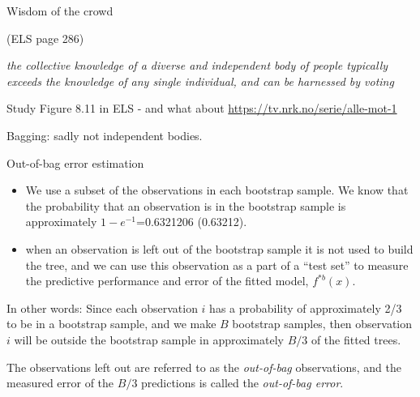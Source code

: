 \documentclass[
  ignorenonframetext,
]{beamer}
\providecommand{\tightlist}{%
  \setlength{\itemsep}{0pt}\setlength{\parskip}{0pt}}
\begin{document}
\begin{frame}

\begin{block}{Wisdom of the crowd}

(ELS page 286)

\emph{the collective knowledge of a diverse and independent body of
people typically exceeds the knowledge of any single individual, and can
be harnessed by voting}

Study Figure 8.11 in ELS - and what about
\url{https://tv.nrk.no/serie/alle-mot-1}

Bagging: sadly not independent bodies.

\end{block}

\end{frame}

\begin{frame}

\begin{block}{Out-of-bag error estimation}

\begin{itemize}
\tightlist
\item
  We use a subset of the observations in each bootstrap sample. We know
  that the probability that an observation is in the bootstrap sample is
  approximately \(1-e^{-1}\)=0.6321206 (0.63212).
\item
  when an observation is left out of the bootstrap sample it is not used
  to build the tree, and we can use this observation as a part of a
  ``test set'' to measure the predictive performance and error of the
  fitted model, \(f^{*b}(x)\).
\end{itemize}

In other words: Since each observation \(i\) has a probability of
approximately 2/3 to be in a bootstrap sample, and we make \(B\)
bootstrap samples, then observation \(i\) will be outside the bootstrap
sample in approximately \(B/3\) of the fitted trees.

The observations left out are referred to as the \emph{out-of-bag}
observations, and the measured error of the \(B/3\) predictions is
called the \emph{out-of-bag error}.

\end{block}

\end{frame}
\end{document}
